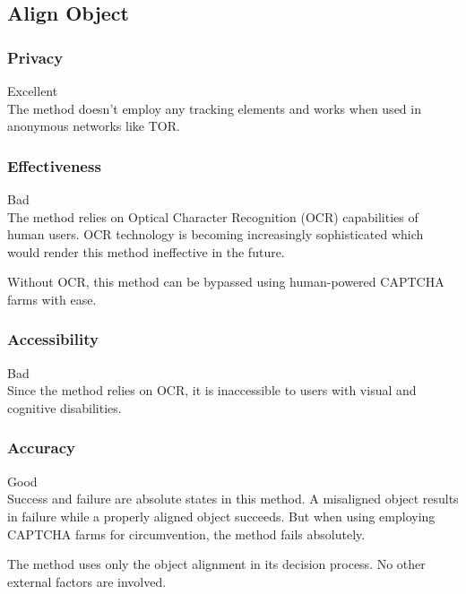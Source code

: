 \subsection{Align Object}

\subsubsection{Privacy}
Excellent\\
The method doesn't employ any tracking elements and works when used in anonymous
networks like TOR\@.

\subsubsection{Effectiveness}
Bad\\
The method relies on Optical Character Recognition (OCR) capabilities of human
users. OCR technology is becoming increasingly sophisticated which would render
this method ineffective in the future.

Without OCR, this method can be bypassed using human-powered CAPTCHA farms with
ease.
\subsubsection{Accessibility}
Bad\\
Since the method relies on OCR, it is inaccessible to users with visual and
cognitive disabilities.
\subsubsection{Accuracy}
Good\\
Success and failure are absolute states in this method. A misaligned object
results in failure while a properly aligned object succeeds. But when using
employing CAPTCHA farms for circumvention, the method fails absolutely.

The method uses only the object alignment in its decision process. No other
external factors are involved.
